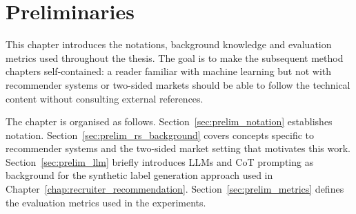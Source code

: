 \chapter{Preliminaries}
\label{chap:preliminaries}

This chapter introduces the notations, background knowledge and evaluation metrics used throughout the thesis. The goal is to make the subsequent method chapters self-contained: a reader familiar with machine learning but not with recommender systems or two-sided markets should be able to follow the technical content without consulting external references.

The chapter is organised as follows. Section~\ref{sec:prelim_notation} establishes notation. Section~\ref{sec:prelim_rs_background} covers concepts specific to recommender systems and the two-sided market setting that motivates this work. Section~\ref{sec:prelim_llm} briefly introduces \glspl{LLM} 
and \gls{CoT} prompting as background for the synthetic label 
generation approach used in Chapter~\ref{chap:recruiter_recommendation}. Section~\ref{sec:prelim_metrics} defines the evaluation metrics used in the experiments.

